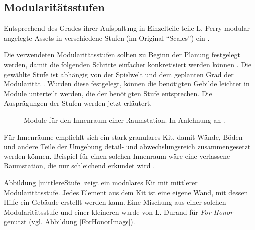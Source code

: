 \subsection{Modularitätsstufen}\label{mstufe}
Entsprechend des Grades ihrer Aufspaltung in Einzelteile teile L. Perry modular angelegte Assets in verschiedene Stufen (im Original \enquote{Scales}) ein \parencite{Perry}.
\par
Die verwendeten Modularitätsstufen sollten zu Beginn der Planung festgelegt werden, damit die folgenden Schritte einfacher konkretisiert werden können \parencite{unrealModular}.  Die gewählte Stufe ist abhängig von der Spielwelt und dem geplanten Grad der Modularität \parencite{unrealModular}. Wurden diese festgelegt, können die benötigten Gebilde leichter in Module unterteilt werden, die der benötigten Stufe entsprechen. Die Ausprägungen der Stufen werden jetzt erläutert.

\begin{figure}[!h]
\centering
  \caption{Module für den Innenraum einer Raumstation. In Anlehnung an \parencite{spacemodular}.}
	\label{spacemodular}
\end{figure}
Für Innenräume empfiehlt sich ein stark granulares Kit, damit Wände, Böden und andere Teile der Umgebung detail- und abwechslungsreich zusammengesetzt werden können. Beispiel für einen solchen Innenraum wäre eine verlassene Raumstation, die nur schleichend erkundet wird \parencite{Perry}.
\par
Abbildung \ref{mittlereStufe} zeigt ein modulares Kit mit mittlerer Modularitätsstufe. Jedes Element aus dem Kit ist eine eigene Wand, mit dessen Hilfe ein Gebäude erstellt werden kann. Eine Mischung aus einer solchen Modularitätsstufe und einer kleineren wurde von  L. Durand für \textit{For Honor} genutzt (vgl. Abbildung \ref{ForHonorImage}).


